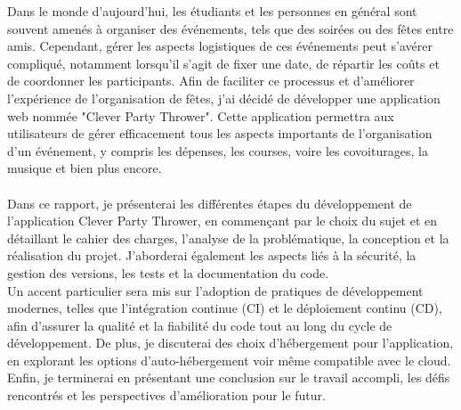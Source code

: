 Dans le monde d'aujourd'hui, les étudiants et les personnes en général sont souvent amenés à organiser des événements, tels que des soirées ou des fêtes entre amis.
Cependant, gérer les aspects logistiques de ces événements peut s'avérer compliqué, notamment lorsqu'il s'agit de fixer une date, de répartir les coûts et de coordonner les participants.
Afin de faciliter ce processus et d'améliorer l'expérience de l'organisation de fêtes, j'ai décidé de développer une application web nommée "Clever Party Thrower".
Cette application permettra aux utilisateurs de gérer efficacement tous les aspects importants de l'organisation d'un événement,
y compris les dépenses, les courses, voire les covoiturages, la musique et bien plus encore.\\\\

Dans ce rapport, je présenterai les différentes étapes du développement de l'application Clever Party Thrower,
en commençant par le choix du sujet et en détaillant le cahier des charges, l'analyse de la problématique, la conception et la réalisation du projet.
J'aborderai également les aspects liés à la sécurité, la gestion des versions, les tests et la documentation du code.\\
Un accent particulier sera mis sur l'adoption de pratiques de développement modernes, telles que l'intégration continue (CI) et le déploiement continu (CD), afin d'assurer la qualité et la fiabilité du code tout au long du cycle de développement.
De plus, je discuterai des choix d'hébergement pour l'application, en explorant les options d'auto-hébergement voir même compatible avec le cloud.\\

Enfin, je terminerai en présentant une conclusion sur le travail accompli, les défis rencontrés et les perspectives d'amélioration pour le futur.